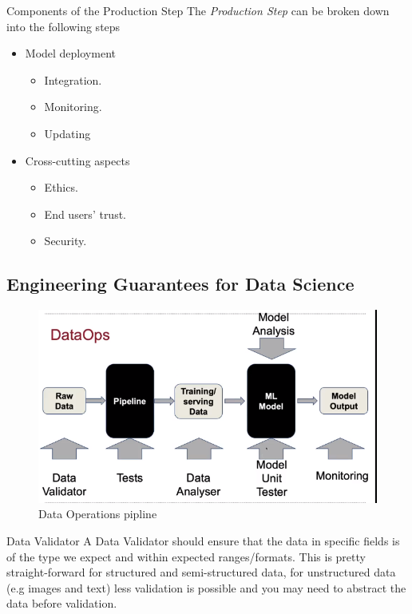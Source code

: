 \documentclass[11pt,a4paper]{article}
\begin{document}
  \begin{proposition}{Components of the Production Step}
    The \textit{Production Step} can be broken down into the following steps
    \begin{itemize}
      \item Model deployment
      \begin{itemize}
        \item Integration.
        \item Monitoring.
        \item Updating
      \end{itemize}
      \item Cross-cutting aspects
      \begin{itemize}
        \item Ethics.
        \item End users' trust.
        \item Security.
      \end{itemize}
    \end{itemize}
  \end{proposition}

\subsection{Engineering Guarantees for Data Science}

  \begin{figure}[H]
    \centering\includegraphics[width=.7\textwidth]{DataOps.PNG}
    \caption{Data Operations pipline}
    \label{fig_data_ops}
  \end{figure}

  \begin{proposition}{Data Validator}
    A Data Validator should ensure that the data in specific fields is of the type we expect and within expected ranges/formats. This is pretty straight-forward for structured and semi-structured data, for unstructured data (e.g images and text) less validation is possible and you may need to abstract the data before validation.
  \end{proposition}
\end{document}
